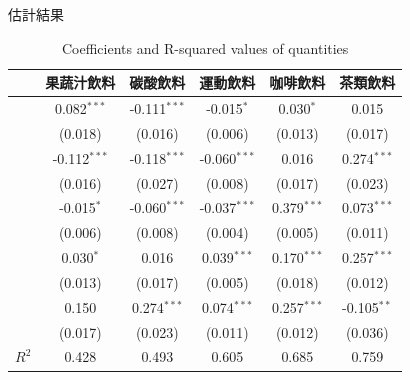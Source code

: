 \documentclass[12pt]{beamer}
\begin{document}
\begin{frame}{估計結果}
	\begin{table}[h]
		\begin{center} \footnotesize{
		\begin{tabular}{lccccc}
			\hline
			 & 果蔬汁飲料 & 碳酸飲料 & 運動飲料 & 咖啡飲料 & 茶類飲料 \\
			\hline
			& \phantom{3}0.082$^{***}$ & \phantom{3}-0.111$^{***}$ & \phantom{1}-0.015$^{*}$ & \phantom{1}0.030$^{*}$ & 0.015 \\[-1.5ex]
			\raisebox{2ex}{$\gamma_{\text{果蔬汁}}$} & (0.018) & (0.016) & (0.006) & (0.013) & (0.017) \\[0ex]
			& \phantom{3}-0.112$^{***}$ & \phantom{3}-0.118$^{***}$ & \phantom{3}-0.060$^{***}$ & 0.016 & \phantom{3}0.274$^{***}$ \\[-2ex]
			\raisebox{2ex}{$\gamma_{\text{碳酸}}$} & (0.016) & (0.027) & (0.008) & (0.017) & (0.023) \\[0ex]
			& \phantom{1}-0.015$^{*}$ & \phantom{3}-0.060$^{***}$ & \phantom{3}-0.037$^{***}$ & \phantom{3}0.379$^{***}$ & \phantom{3}0.073$^{***}$ \\[-2ex]
			\raisebox{2ex}{$\gamma_{\text{運動}}$} & (0.006) & (0.008) & (0.004) & (0.005) & (0.011) \\[0ex]
			& \phantom{1}0.030$^{*}$ & 0.016 & \phantom{3}0.039$^{***}$ & \phantom{3}0.170$^{***}$ & \phantom{3}0.257$^{***}$ \\[-2ex]
			\raisebox{2ex}{$\gamma_{\text{咖啡}}$} & (0.013) & (0.017) & (0.005) & (0.018) & (0.012) \\[0ex]
			& 0.150 & \phantom{3}0.274$^{***}$  & \phantom{3}0.074$^{***}$ & \phantom{3}0.257$^{***}$ & \phantom{2}-0.105$^{**}$\\[-2ex]
			\raisebox{2ex}{$\gamma_{\text{茶類}}$} & (0.017) & (0.023) & (0.011) & (0.012) & (0.036) \\[0ex]
			\hline
			$R^2$ & 0.428 & 0.493 & 0.605 & 0.685 & 0.759 \\
			\hline
		\end{tabular} }
		\end{center}
		\caption{\footnotesize Coefficients and R-squared values of quantities}
		\label{turns2}
	\end{table}

\end{frame}


\end{document}
